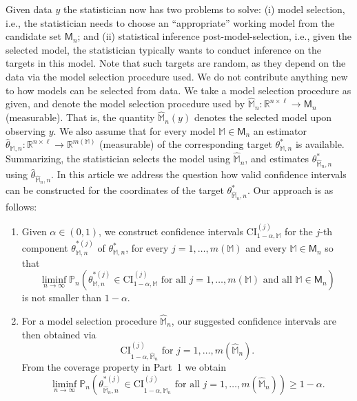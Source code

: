 \documentclass[preprint]{imsart}
\newcommand{\R}{{\mathbb R}}
\newcommand{\M}{\mathbb M}
\numberwithin{equation}{section}
\begin{document}
Given data $y$ the statistician now has two problems to solve: (i) model selection, i.e., the statistician needs to choose an ``appropriate'' working model from the candidate set $\mathsf{M}_n$; and (ii) statistical inference post-model-selection, i.e., given the selected model, the statistician typically wants to conduct inference on the targets in this model. Note that such targets are  random, as they depend on the data via the model selection procedure used. We do not contribute anything new to how models can be selected from data. We take a model selection procedure as given, and denote the model selection procedure used by $\hat{\mathbb{M}}_n: \R^{n \times \ell} \to \mathsf{M}_n$ (measurable). That is, the quantity $\hat{\mathbb{M}}_n(y)$ denotes the selected model upon observing $y$. We also assume that for every model $\mathbb{M} \in \mathsf{M}_n$ an estimator $\hat{\theta}_{\mathbb{M},n}: \R^{n \times \ell} \to \R^{m(\mathbb{M})}$ (measurable) of the corresponding target $\theta^*_{\mathbb{M},n}$ is available. Summarizing, the statistician selects the model using $\hat{\mathbb{M}}_n$, and estimates $\theta^*_{\hat{\mathbb{M}}_n,n}$ using $\hat{\theta}_{\hat{\mathbb{M}}_n, n}$. In this article we address the question how valid confidence intervals can be constructed for the coordinates of the target $\theta^*_{\hat{\mathbb{M}}_n,n}$. Our approach is as follows:
%
\begin{enumerate}
\item Given $\alpha \in (0, 1)$, we construct confidence intervals $\mathrm{\mathrm{CI}}^{(j)}_{1-\alpha, \mathbb{M}}$ for the $j$-th component $\theta_{\mathbb{M}, n}^{*(j)}$ of $\theta_{\mathbb{M}, n}^{*}$, for every $j = 1, \hdots, m(\mathbb{M})$ and every $\mathbb{M} \in \mathsf{M}_n$ so that
%
\begin{equation*}
\liminf_{n \to \infty} \mathbb{P}_n\left( \theta^{*(j)}_{\mathbb{M}, n} \in \mathrm{CI}^{(j)}_{1-\alpha, \mathbb{M}} \text{ for all } j = 1, \hdots, m(\mathbb{M}) \text{ and all } \mathbb{M} \in \mathsf{M}_n \right)
\end{equation*}
%
is not smaller than $1-\alpha$.
\item For a model selection procedure $\hat{\M}_n$, our suggested confidence intervals are then obtained via 
%
\begin{equation*}
\mathrm{\mathrm{CI}}^{(j)}_{1-\alpha, \hat{\mathbb{M}}_n} \text{ for } j = 1, \hdots, m(\hat{\mathbb{M}}_n).
\end{equation*}
%
From the coverage property in Part~1 we obtain
%
\begin{equation*}
\liminf_{n \to \infty} \mathbb{P}_n\left( \theta^{*(j)}_{\hat{\mathbb{M}}_n, n} \in \mathrm{CI}^{(j)}_{1-\alpha, \hat{\mathbb{M}}_n} \text{ for all } j = 1, \hdots, m(\hat{\mathbb{M}}_n) \right) \geq 1-\alpha.
\end{equation*}
%
\end{enumerate}
%
\end{document}
